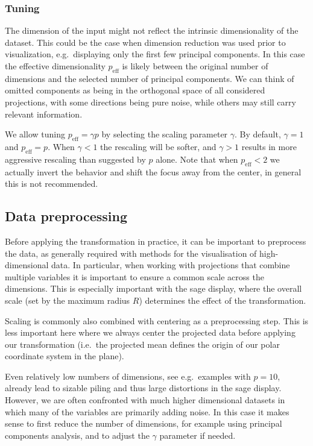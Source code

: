 \documentclass[]{interact}
\theoremstyle{plain}%
\theoremstyle{definition}
\theoremstyle{remark}
\begin{document}
\hypertarget{tuning}{%
\subsubsection{Tuning}\label{tuning}}

The dimension of the input might not reflect the intrinsic
dimensionality of the dataset. This could be the case when dimension
reduction was used prior to visualization, e.g.~displaying only the
first few principal components. In this case the effective
dimensionality \(p_{\mathrm{eff}}\) is likely between the original
number of dimensions and the selected number of principal components. We
can think of omitted components as being in the orthogonal space of all
considered projections, with some directions being pure noise, while
others may still carry relevant information.

We allow tuning \(p_{\mathrm{eff}} = \gamma p\) by selecting the scaling
parameter \(\gamma\). By default, \(\gamma=1\) and
\(p_{\mathrm{eff}}=p\). When \(\gamma<1\) the rescaling will be softer,
and \(\gamma>1\) results in more aggressive rescaling than suggested by
\(p\) alone. Note that when \(p_{\mathrm{eff}} < 2\) we actually invert
the behavior and shift the focus away from the center, in general this
is not recommended.

\hypertarget{sec:prep}{%
\subsection{Data preprocessing}\label{sec:prep}}

Before applying the transformation in practice, it can be important to
preprocess the data, as generally required with methods for the
visualisation of high-dimensional data. In particular, when working with
projections that combine multiple variables it is important to ensure a
common scale across the dimensions. This is especially important with
the sage display, where the overall scale (set by the maximum radius
\(R\)) determines the effect of the transformation.

Scaling is commonly also combined with centering as a preprocessing
step. This is less important here where we always center the projected
data before applying our transformation (i.e.~the projected mean defines
the origin of our polar coordinate system in the plane).

Even relatively low numbers of dimensions, see e.g.~examples with
\(p=10\), already lead to sizable piling and thus large distortions in
the sage display. However, we are often confronted with much higher
dimensional datasets in which many of the variables are primarily adding
noise. In this case it makes sense to first reduce the number of
dimensions, for example using principal components analysis, and to
adjust the \(\gamma\) parameter if needed.
\end{document}
